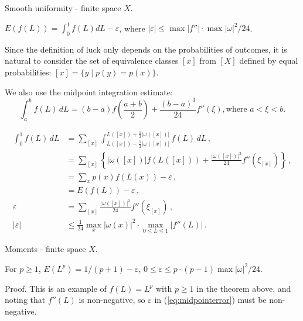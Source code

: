 \begin{theorem}{Smooth uniformity - finite space $X$.}

$E(f(L))=\int_0^1 f(L) dL-\varepsilon$, where $|\varepsilon| \leq \max|f''| \cdot \max |\omega|^2 / 24$.

Since the definition of luck only depends on the probabilities of outcomes, it is natural to consider the set of equivalence classes $[x]$ from $[X]$ defined by equal probabilities: $[x]=\{y \mid p(y)=p(x) \}$.  

We also use the midpoint integration estimate:
\begin{equation*}
\int_{a}^{b} f(L) \, dL = (b-a)f(\frac{a+b}{2})+\frac{(b-a)^3}{24} f''(\xi), \text{where $a < \xi < b$.}
\end{equation*}

\begin{align}
\int_0^1 f(L) \, dL 
  &= \sum_{[x]} \int_{L([x])-\frac{1}{2}|\omega([x])|}^{L([x])+\frac{1}{2}|\omega([x])|} f(L) \, dL \,, \\
  &= \sum_{[x]} \left\{ |\omega([x])| f(L([x])) + \frac{|\omega([x])|^3}{24} f''(\xi_{[x]}) \right\} \,, \\
  &= \sum_{x} p(x) f(L(x)) - \varepsilon \,, \\
  &= E(f(L)) -\varepsilon \,, \\
\varepsilon 
\label{eq:midpointerror}
   &= \sum_{[x]} \frac{|\omega([x])|^3}{24} f''(\xi_{[x]}) \,, \\
 |\varepsilon| 
   &\leq \frac{1}{24} \max_{x} |\omega(x)|^2 \cdot \max_{0\leq L \leq 1} |f''(L)| \,.
\end{align}
\end{theorem}

\begin{theorem}{Moments - finite space $X$.}

For $p \geq 1$, $E(L^p)=1/(p+1)-\varepsilon$, $0 \leq \varepsilon \leq p \cdot (p-1) \max |\omega|^2/24$.

Proof.  This is an example of $f(L)=L^p$ with $p \geq 1$ in the theorem above, and noting that $f''(L)$ is non-negative, so $\varepsilon$ in (\ref{eq:midpointerror}) must be non-negative.
\end{theorem}

